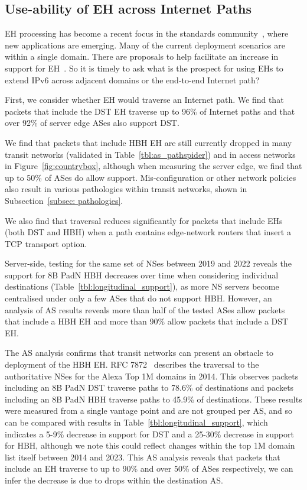 \documentclass[conference]{IEEEtran}
\begin{document}
\subsection{Use-ability of EH across Internet Paths}

 EH processing has become a recent focus in the standards community~\cite {ietf-v6ops-hbh-03}, where new applications are emerging. Many of the current deployment scenarios are within a single domain. There are proposals to help facilitate an increase in support for EH~\cite{ietf-6man-HBH-processing-06, ietf-6man-eh-limits-02}. 
 So it is timely to ask what is the prospect for using EHs to extend IPv6 across adjacent domains or the end-to-end Internet path?

First, we consider whether EH would traverse an Internet path.
We find that packets that include the DST EH traverse up to 96\% of Internet paths and that over 92\% of server edge ASes also support DST.


We find that packets that include HBH EH are still currently dropped in many transit networks (validated in Table~\ref{tbl:as_pathspider}) and in access networks in Figure~\ref{fig:countrybox}, although when measuring the server edge, we find that up to 50\% of ASes do allow support. Mis-configuration or other network policies also result in various pathologies within transit networks, shown in Subsection~\ref{subsec: pathologies}. 

We also find that traversal reduces significantly for packets that include EHs (both DST and HBH) when a path contains edge-network routers that insert a TCP transport option.

Server-side, testing for the same set of NSes between 2019 and 2022 reveals the support for 8B PadN HBH decreases over time when considering individual destinations (Table~\ref{tbl:longitudinal_support}), as more NS servers become centralised under only a few ASes that do not support HBH.  However, an analysis of AS results reveals more than half of the tested ASes allow packets that include a HBH EH and more than 90\% allow packets that include a DST EH. 

The AS analysis confirms that transit networks can present an obstacle to deployment of the HBH EH.
RFC 7872~\cite{RFC7872} describes the traversal to the authoritative NSes for the Alexa Top 1M domains in 2014. This observes packets including an 8B PadN DST traverse paths to  78.6\% of destinations and packets including an 8B PadN HBH traverse paths to 45.9\% of destinations. These results were measured from a single vantage point and are not grouped per AS, and so can be compared with results in Table~\ref{tbl:longitudinal_support}, which indicates a 5-9\% decrease in support for DST and a 25-30\% decrease in support for HBH, although we note this could reflect changes within the top 1M domain list itself between 2014 and 2023.
This AS analysis reveals that packets that include an EH traverse to up to 90\% and over 50\% of ASes respectively, we can infer the decrease is due to drops within the destination AS.
\end{document}
